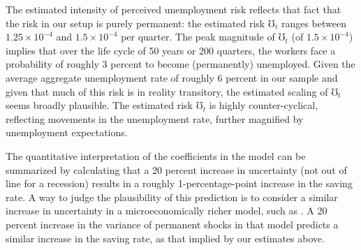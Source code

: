 \documentclass[titlepage]{\econtex}
\begin{document}
The estimated intensity of perceived unemployment risk reflects that fact that the risk in our setup is purely permanent: the estimated risk $\mho_t$ ranges between $1.25\times10^{-4}$ and $1.5\times10^{-4}$ per quarter. The peak magnitude of $\mho_t$ (of $1.5\times10^{-4}$) implies that over the life cycle of 50 years or 200 quarters, the workers face a probability of roughly 3 percent to become (permanently) unemployed. Given the average aggregate unemployment rate of roughly 6 percent in our sample and given that much of this risk is in reality transitory, the estimated scaling of $\mho_t$ seems broadly plausible.
The estimated risk $\mho_t$ is highly counter-cyclical, reflecting movements in the unemployment rate, further magnified by unemployment expectations.

The quantitative interpretation of the coefficients in the model can be summarized by calculating  that a 20 percent increase in uncertainty (not out of line for a recession) results in a roughly 1-percentage-point increase in the saving rate.  A way to judge the plausibility of this prediction is to consider a similar increase in uncertainty in a microeconomically richer model, such as \cite{cstwMPC}. A 20 percent increase in the variance of permanent shocks in that model predicts a similar increase in the saving rate, as that implied by our estimates above.
\end{document}
